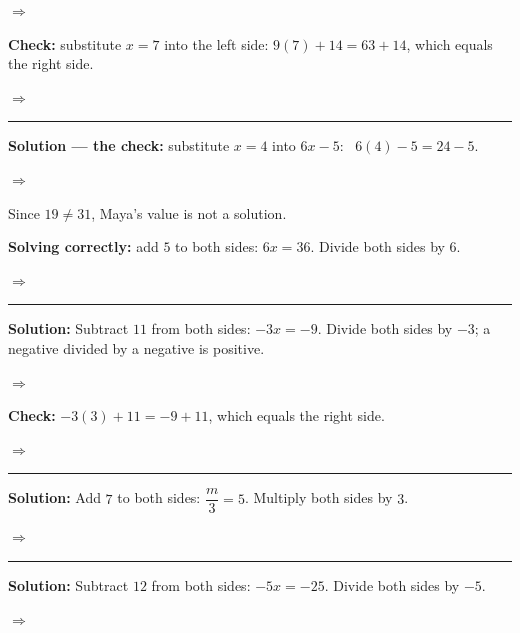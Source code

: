 \documentclass[12pt]{article}
\begin{document}
$\Rightarrow$ 

\textbf{Check:} substitute $x = 7$ into the left side: $9(7) + 14 = 63 + 14$, which equals the right side.

$\Rightarrow$ 

\vspace{0.15cm}\noindent\rule{\linewidth}{0.2pt}


\textbf{Solution --- the check:} substitute $x = 4$ into $6x - 5$: \ $6(4) - 5 = 24 - 5$.

$\Rightarrow$ 

Since $19 \neq 31$, Maya's value is not a solution.

\textbf{Solving correctly:} add $5$ to both sides: $6x = 36$. Divide both sides by $6$.

$\Rightarrow$ 

\vspace{0.15cm}\noindent\rule{\linewidth}{0.2pt}


\textbf{Solution:} Subtract $11$ from both sides: $-3x = -9$. Divide both sides by $-3$; a negative divided by a negative is positive.

$\Rightarrow$ 

\textbf{Check:} $-3(3) + 11 = -9 + 11$, which equals the right side.

$\Rightarrow$ 

\vspace{0.15cm}\noindent\rule{\linewidth}{0.2pt}


\textbf{Solution:} Add $7$ to both sides: $\dfrac{m}{3} = 5$. Multiply both sides by $3$.

$\Rightarrow$ 

\vspace{0.15cm}\noindent\rule{\linewidth}{0.2pt}


\textbf{Solution:} Subtract $12$ from both sides: $-5x = -25$. Divide both sides by $-5$.

$\Rightarrow$ 
\end{document}
